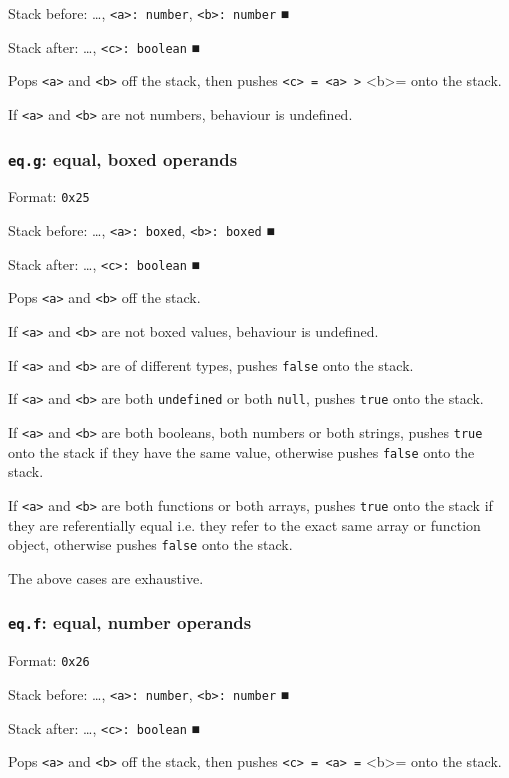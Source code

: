 Stack before: \ldots{}​, \texttt{<a>: number}, \texttt{<b>: number} ■

Stack after: \ldots{}​, \texttt{<c>: boolean} ■

Pops \texttt{<a>} and \texttt{<b>} off the stack, then pushes \texttt{<c> = <a> >} <b>= onto
the stack.

If \texttt{<a>} and \texttt{<b>} are not numbers, behaviour is undefined.

\subsubsection{\texttt{eq.g}: equal, boxed operands}
\label{sec:orgb222de9}
Format: \texttt{0x25}

Stack before: \ldots{}​, \texttt{<a>: boxed}, \texttt{<b>: boxed} ■

Stack after: \ldots{}​, \texttt{<c>: boolean} ■

Pops \texttt{<a>} and \texttt{<b>} off the stack.

If \texttt{<a>} and \texttt{<b>} are not boxed values, behaviour is undefined.

If \texttt{<a>} and \texttt{<b>} are of different types, pushes \texttt{false} onto the
stack.

If \texttt{<a>} and \texttt{<b>} are both \texttt{undefined} or both \texttt{null}, pushes \texttt{true}
onto the stack.

If \texttt{<a>} and \texttt{<b>} are both booleans, both numbers or both strings,
pushes \texttt{true} onto the stack if they have the same value, otherwise
pushes \texttt{false} onto the stack.

If \texttt{<a>} and \texttt{<b>} are both functions or both arrays, pushes \texttt{true} onto
the stack if they are referentially equal i.e. they refer to the exact
same array or function object, otherwise pushes \texttt{false} onto the stack.

The above cases are exhaustive.

\subsubsection{\texttt{eq.f}: equal, number operands}
\label{sec:orge0a190c}
Format: \texttt{0x26}

Stack before: \ldots{}​, \texttt{<a>: number}, \texttt{<b>: number} ■

Stack after: \ldots{}​, \texttt{<c>: boolean} ■

Pops \texttt{<a>} and \texttt{<b>} off the stack, then pushes \texttt{<c> = <a> =} <b>= onto
the stack.

